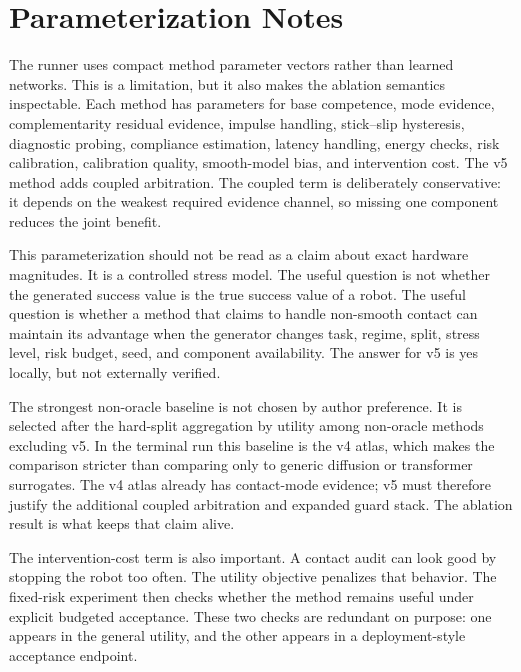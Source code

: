 \documentclass{article}
\begin{document}
\clearpage
\section{Parameterization Notes}
The runner uses compact method parameter vectors rather than learned networks. This is a limitation, but it also makes the ablation semantics inspectable. Each method has parameters for base competence, mode evidence, complementarity residual evidence, impulse handling, stick--slip hysteresis, diagnostic probing, compliance estimation, latency handling, energy checks, risk calibration, calibration quality, smooth-model bias, and intervention cost. The v5 method adds coupled arbitration. The coupled term is deliberately conservative: it depends on the weakest required evidence channel, so missing one component reduces the joint benefit.

This parameterization should not be read as a claim about exact hardware magnitudes. It is a controlled stress model. The useful question is not whether the generated success value is the true success value of a robot. The useful question is whether a method that claims to handle non-smooth contact can maintain its advantage when the generator changes task, regime, split, stress level, risk budget, seed, and component availability. The answer for v5 is yes locally, but not externally verified.

The strongest non-oracle baseline is not chosen by author preference. It is selected after the hard-split aggregation by utility among non-oracle methods excluding v5. In the terminal run this baseline is the v4 atlas, which makes the comparison stricter than comparing only to generic diffusion or transformer surrogates. The v4 atlas already has contact-mode evidence; v5 must therefore justify the additional coupled arbitration and expanded guard stack. The ablation result is what keeps that claim alive.

The intervention-cost term is also important. A contact audit can look good by stopping the robot too often. The utility objective penalizes that behavior. The fixed-risk experiment then checks whether the method remains useful under explicit budgeted acceptance. These two checks are redundant on purpose: one appears in the general utility, and the other appears in a deployment-style acceptance endpoint.

\clearpage
\end{document}
